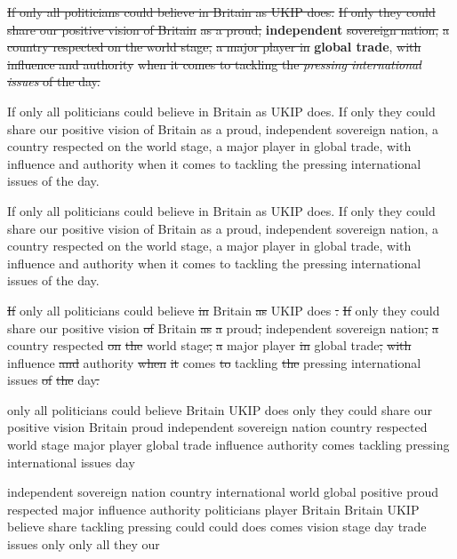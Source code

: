 \sout<2->{If only all politicians could believe in Britain as UKIP does.}
\sout<3->{If only they could share our positive vision of Britain}
\sout<4->{as a proud,} \textbf<4->{independent} \sout<4->{sovereign nation,}
\sout<5->{a country respected on the world stage,}
\sout<6->{a major player in} \textbf<6->{global trade}, 
\sout<7->{with influence and authority}
\sout<9->{when it comes to tackling the \textit<8>{pressing international issues} of the day.}





If only all politicians could believe in Britain as UKIP does.
If only they could share our positive vision of Britain as a proud, independent sovereign nation, a country respected on the world stage, a major player in global trade, with influence and authority when it comes to tackling the pressing international issues of the day.

If only all politicians could believe in Britain as UKIP does.
If only they could share our positive vision of Britain 
as a proud, independent sovereign nation, 
a country respected on the world stage, 
a major player in global trade, 
with influence and authority 
when it comes to tackling the pressing international issues of the day.




\sout<2->{If} only all politicians could believe \sout<2->{in} Britain \sout<2->{as} UKIP does \sout<2->{.} \sout<2->{If} only they could share our positive vision \sout<2->{of} Britain \sout<2->{as} \sout<2->{a} proud\sout<2->{,} independent sovereign nation\sout<2->{,} \sout<2->{a} country respected \sout<2->{on} \sout<2->{the} world stage\sout<2->{,} \sout<2->{a} major player \sout<2->{in} global trade\sout<2->{,} \sout<2->{with} influence \sout<2->{and} authority \sout<2->{when} \sout<2->{it} comes \sout<2->{to} tackling \sout<2->{the} pressing international issues \sout<2->{of} \sout<2->{the} day\sout<2->{.}

only all politicians could believe Britain UKIP does only they could share our positive vision Britain proud independent sovereign nation country respected world stage major player global trade influence authority comes tackling pressing international issues day

independent sovereign nation country international world global 
positive proud respected major influence authority 
politicians player Britain Britain UKIP 
believe share tackling pressing 
could could does comes 
vision stage day trade issues 
only only all they our 

